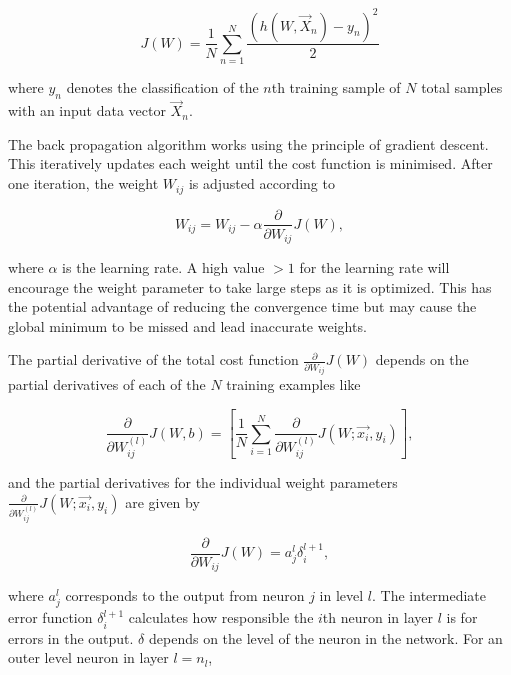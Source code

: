 \documentclass[10pt]{article}
\begin{document}
\begin{equation}
J(W) = \frac{1}{N} \sum_{n=1}^N \frac{ \left( h(W,\vec{X}_n) - y_n \right)^2} {2}
\label{eq_cost}
\end{equation}

\noindent where $y_n$ denotes the classification of the $n$th training sample of $N$ total samples with an input data vector $\vec{X}_n$.



The back propagation algorithm works using the principle of gradient descent. This iteratively updates each weight until the cost function is minimised. After one iteration, the weight $W_{ij}$ is adjusted according to 

\begin{equation}
W_{ij} = W_{ij} - \alpha \frac{\partial}{\partial W_{ij}} J\left( W \right),
\label{eq_adjust_w}
\end{equation}



\noindent where $\alpha$ is the learning rate. A high value $>1$ for the learning rate will encourage the weight parameter to take large steps as it is optimized. This has the potential advantage of reducing the convergence time but may cause the global minimum to be missed and lead inaccurate weights.

The partial derivative of the total cost function $\frac{\partial}{\partial W_{ij}} J\left( W \right)$ depends on the partial derivatives of each of the $N$ training examples like 

\begin{equation}
\frac{\partial}{\partial W_{ij}^{(l)}} J(W,b) = \left[ \frac{1}{N} \sum_{i=1}^N \frac{\partial}{\partial W_{ij}^{(l)}} J(W; \vec{x_i}, y_i) \right], 
\label{eq_partial_tot}
\end{equation}


\noindent and the partial derivatives for the individual weight parameters $\frac{\partial}{\partial W_{ij}^{(l)}} J(W; \vec{x_i}, y_i)$ are given by 



\begin{equation}
\frac{\partial}{\partial W_{ij}} J\left( W \right) = a_j^l \delta_i^{l+1},
\label{eq_partdiv}
\end{equation}

\noindent where $a_j^l$ corresponds to the output from neuron $j$ in level $l$. The intermediate error function $\delta_i^{l+1}$ calculates how responsible the $i$th neuron in layer $l$ is for errors in the output. $\delta$ depends on the level of the neuron in the network. For an outer level neuron in layer $l=n_l$,
\end{document}
